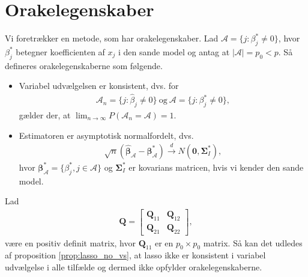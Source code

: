 \section{Orakelegenskaber}
Vi foretrækker en metode, som har orakelegenskaber. Lad $\mathcal{A} =\{j:\beta_j^* \neq 0\}$, hvor $\beta_j^*$ betegner koefficienten af $x_j$ i den sande model og antag at $\vert \mathcal{A} \vert=p_0 <p$. Så defineres orakelegenskaberne som følgende. 

\begin{defn}[Orakelegenskaber]
\begin{itemize}
\item Variabel udvælgelsen er konsistent, dvs. for
\begin{align*}
\mathcal{A}_n=\lbrace j :\hat{\beta}_j \neq 0 \rbrace \ \text{og} \ \mathcal{A} =\{j:\beta_j^* \neq 0\},
\end{align*}
gælder der, at $\lim_{n \rightarrow \infty }P(\mathcal{A}_n=\mathcal{A})=1$.
\item Estimatoren er asymptotisk normalfordelt, dvs.
\begin{align*}
\sqrt{n}(\hat{\boldsymbol{\beta}}_\mathcal{A}-\boldsymbol{\beta}^*_\mathcal{A}) \overset{d}{\rightarrow} N(\mathbf{0}, \boldsymbol{\Sigma}^*_I),
\end{align*}
hvor $\boldsymbol{\beta}^*_\mathcal{A}=\{ \beta_j^*, j \in \mathcal{A} \}$ og $\boldsymbol{\Sigma}^*_I$ er kovarians matricen, hvis vi kender den sande model.
\end{itemize}
\end{defn}

%
Lad  
\begin{align*}
\textbf{Q} = 
\begin{bmatrix}
\textbf{Q}_{11}& \textbf{Q}_{12}\\
\textbf{Q}_{21}& \textbf{Q}_{22}
\end{bmatrix},
\end{align*}
være en positiv definit matrix, hvor $\textbf{Q}_{11}$ er en $p_0 \times p_0$ matrix. Så kan det udledes af proposition \ref{prop:lasso_no_vs}, at lasso ikke er konsistent i variabel udvælgelse i alle tilfælde og dermed ikke opfylder orakelegenskaberne.

